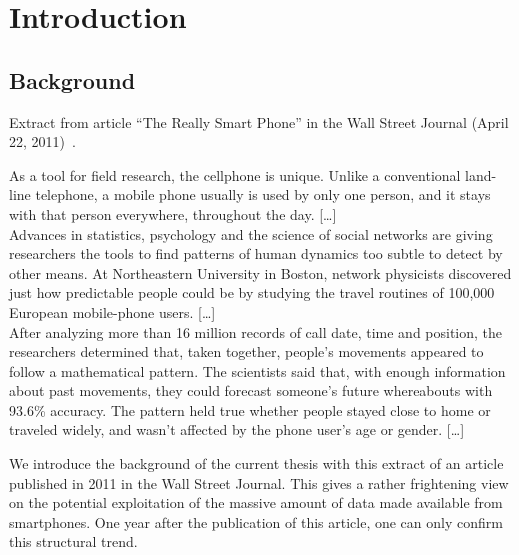 \chapter*{Introduction}

\section*{Background}

Extract from article ``The Really Smart Phone'' in the Wall Street Journal (April 22, 2011)~\cite{really-smart-phone}.

\begin{quotationalt}
  [\dots]
  As a tool for field research, the cellphone is unique. Unlike a
  conventional land-line telephone, a mobile phone usually is used by
  only one person, and it stays with that person everywhere,
  throughout the day.
  [\dots]\\

  Advances in statistics, psychology and the
  science of social networks are giving researchers the tools to find
  patterns of human dynamics too subtle to detect by other means. At
  Northeastern University in Boston, network physicists discovered
  just how predictable people could be by studying the travel routines
  of 100,000 European mobile-phone users.
  [\dots]\\

  After analyzing more than
  16 million records of call date, time and position, the researchers
  determined that, taken together, people's movements appeared to
  follow a mathematical pattern. The scientists said that, with enough
  information about past movements, they could forecast someone's
  future whereabouts with 93.6\% accuracy.
  The pattern held true whether people stayed close to home or
  traveled widely, and wasn't affected by the phone user's age or
  gender.
  [\dots]\\
\end{quotationalt}

We introduce the background of the current thesis with this extract of an article published in 2011 in the Wall Street Journal.
This gives a rather frightening view on the potential exploitation of the massive amount of data made available from smartphones.
One year after the publication of this article, one can only confirm this structural trend.\\


